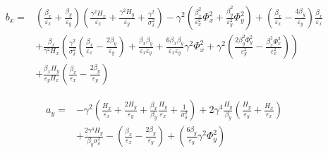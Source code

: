 \begin{equation}
    \begin{aligned}
        b_x = & \left(\frac{\beta_x}{\varepsilon_x} + \frac{\beta_y}{\varepsilon_y}\right) \left(\frac{\gamma^2 H_x}{\varepsilon_x} + \frac{\gamma^2 H_y}{\varepsilon_y} + \frac{\gamma^2}{\sigma_{\delta}^{2}}\right) - \gamma^2 \left(\frac{\beta_x^{2}}{\varepsilon_x^{2}} \Phi_x^{2} + \frac{\beta_y^{2}}{\varepsilon_y^{2}} \Phi_y^{2}\right) + \left(\frac{\beta_x}{\varepsilon_x} - \frac{4 \beta_y}{\varepsilon_y}\right) \frac{\beta_x}{\varepsilon_x} \\
              & + \frac{\beta_x}{\gamma^2 H_x} \left(\frac{\gamma^2}{\sigma_{\delta}^{2}} \left(\frac{\beta_x}{\varepsilon_x} - \frac{2 \beta_y}{\varepsilon_y} \right) + \frac{\beta_x \beta_y}{\varepsilon_x \varepsilon_y} + \frac{6 \beta_x \beta_y}{\varepsilon_x \varepsilon_y} \gamma^2 \Phi_x^{2} + \gamma^2 \left(\frac{2 \beta_y^{2} \Phi_y^{2}}{\varepsilon_y^{2}} - \frac{\beta_x^{2} \Phi_x^{2}}{\varepsilon_x^{2}}\right)\right) \\
              & + \frac{\beta_x H_y}{\varepsilon_y H_x} \left(\frac{\beta_x}{\varepsilon_x} - \frac{2 \beta_y}{\varepsilon_y}\right)
    \end{aligned}
    \label{equation:bm_bx}
\end{equation}

\begin{equation}
    \begin{aligned}
    a_y = & - \gamma^2 \left(\frac{H_x}{\varepsilon_x} + \frac{2 H_y}{\varepsilon_y} + \frac{\beta_x}{\beta_y} \frac{H_y}{\varepsilon_x} + \frac{1}{\sigma_{\delta}^{2}}\right) + 2 \gamma^4 \frac{H_y}{\beta_y} \left(\frac{H_y}{\varepsilon_y} + \frac{H_x}{\varepsilon_x}\right) \\
          & + \frac{2 \gamma^4 H_y}{\beta_y \sigma_{\delta}^{2}} - \left(\frac{\beta_x}{\varepsilon_x} - \frac{2 \beta_y}{\varepsilon_y}\right) + \left(\frac{6 \beta_y}{\varepsilon_y} \gamma^2 \Phi_y^{2}\right)
    \end{aligned}
    \label{equation:bm_ay}
\end{equation}

